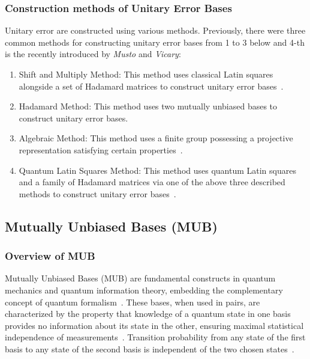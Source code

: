 \subsubsection{Construction methods of Unitary Error Bases}
Unitary error are constructed using various methods. Previously, there were three common methods for constructing unitary error bases from 1 to 3 below and 4-th is the recently introduced by \textit{Musto} and \textit{Vicary}:
\begin{enumerate}
  \item Shift and Multiply Method: This method uses classical Latin squares alongside a set of Hadamard matrices to construct unitary error bases~\cite{werner2001AllTeleportationDense}.
  \item Hadamard Method: This method uses two mutually unbiased bases to construct unitary error bases.
  \item Algebraic Method:  This method uses a finite group possessing a projective representation satisfying certain properties~\cite{knill1996GroupRepresentationsError}.
  \item Quantum Latin Squares Method: This method uses quantum Latin squares and a family of Hadamard matrices via one of the above three described methods to construct unitary error bases~\cite{vicary2016QuantumLatinSquares}.
\end{enumerate}


\subsection{Mutually Unbiased Bases (MUB)}

\subsubsection{Overview of MUB}

Mutually Unbiased Bases (MUB) are fundamental constructs in quantum mechanics and quantum information theory, embedding the complementary concept of quantum formalism~\cite{paterek2010ConnectionMutuallyUnbiased}.
These bases, when used in pairs, are characterized by the property that knowledge of a quantum state in one basis provides no information about its state in the other, ensuring maximal statistical independence of measurements~\cite{ivanovic1997unbiasedprojectorbasis}.
Transition probability from any state of the first basis to any state of the second basis is independent of the two chosen states~\cite{song2020ConstructionMutuallyUnbiased}.

